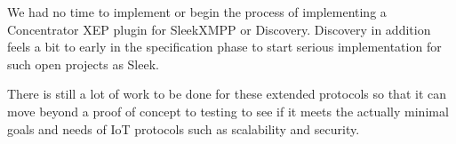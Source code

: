 We had no time to implement or begin the process of implementing a Concentrator
XEP plugin for SleekXMPP or Discovery. Discovery in addition feels a bit to
early in the specification phase to start serious implementation for such open
projects as Sleek.

There is still a lot of work to be done for these extended protocols so that it
can move beyond a proof of concept to testing to see if it meets the actually
minimal goals and needs of IoT protocols such as scalability and security.
